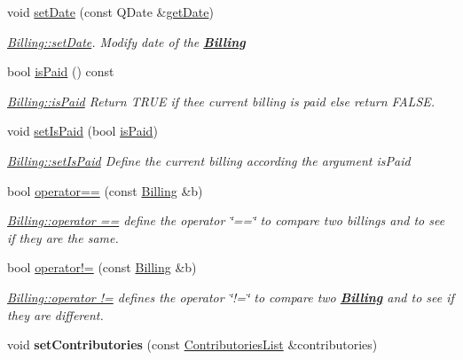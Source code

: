 \begin{DoxyCompactItemize}
void \hyperlink{classModels_1_1Billing_ae8db0fe5fe273fad31e2f846b5b891cb}{set\+Date} (const Q\+Date \&\hyperlink{classModels_1_1Billing_af0d1f0132d0902fb96456d0a9018b701}{get\+Date})
\begin{DoxyCompactList}\small\item\em \hyperlink{classModels_1_1Billing_ae8db0fe5fe273fad31e2f846b5b891cb}{Billing\+::set\+Date}. Modify {\itshape date} of the {\bfseries \hyperlink{classModels_1_1Billing}{Billing}} \end{DoxyCompactList}\item 
bool \hyperlink{classModels_1_1Billing_ab2f9bd62e920be8c68313e35bbcabd46}{is\+Paid} () const 
\begin{DoxyCompactList}\small\item\em \hyperlink{classModels_1_1Billing_ab2f9bd62e920be8c68313e35bbcabd46}{Billing\+::is\+Paid} Return T\+R\+U\+E if thee current billing is paid else return F\+A\+L\+S\+E. \end{DoxyCompactList}\item 
void \hyperlink{classModels_1_1Billing_a99cf8c1b7435fe268b8fa9257cad6c56}{set\+Is\+Paid} (bool \hyperlink{classModels_1_1Billing_ab2f9bd62e920be8c68313e35bbcabd46}{is\+Paid})
\begin{DoxyCompactList}\small\item\em \hyperlink{classModels_1_1Billing_a99cf8c1b7435fe268b8fa9257cad6c56}{Billing\+::set\+Is\+Paid} Define the current billing according the argument {\itshape is\+Paid} \end{DoxyCompactList}\item 
bool \hyperlink{classModels_1_1Billing_af3d8818a1e00eaa707058567fccf045b}{operator==} (const \hyperlink{classModels_1_1Billing}{Billing} \&b)
\begin{DoxyCompactList}\small\item\em \hyperlink{classModels_1_1Billing_af3d8818a1e00eaa707058567fccf045b}{Billing\+::operator ==} define the operator \char`\"{}==\char`\"{} to compare two billings and to see if they are the same. \end{DoxyCompactList}\item 
bool \hyperlink{classModels_1_1Billing_ae6ff88e05384718d57be1be38f250a52}{operator!=} (const \hyperlink{classModels_1_1Billing}{Billing} \&b)
\begin{DoxyCompactList}\small\item\em \hyperlink{classModels_1_1Billing_ae6ff88e05384718d57be1be38f250a52}{Billing\+::operator !=} defines the operator \char`\"{}!=\char`\"{} to compare two {\bfseries \hyperlink{classModels_1_1Billing}{Billing}} and to see if they are different. \end{DoxyCompactList}\item 
\hypertarget{classModels_1_1Billing_acb836caf7aef8e953c432661cb8aa55f}{}void {\bfseries set\+Contributories} (const \hyperlink{classModels_1_1ContributoriesList}{Contributories\+List} \&contributories)\label{classModels_1_1Billing_acb836caf7aef8e953c432661cb8aa55f}


\end{DoxyCompactItemize}

